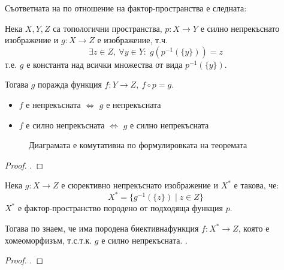 Съответната на  по отношение на фактор-пространства е следната:
\begin{theorem}\label{th:factor-continuous}
    Нека $X, Y, Z$ са топологични пространства, $p: X \to Y$ е силно непрекъснато изображение и $g: X \to Z$ е изображение, т.ч.
    \begin{equation}
        \exists z \in Z,\ \forall y \in Y:\; g(p^{-1}(\{y\})) = z
    \end{equation}
    т.е. $g$ е константа над всички множества от вида $p^{-1}(\{y\})$.

    Тогава $g$ поражда функция $f: Y \to Z,\ f \circ p = g$.
    \begin{itemize}
        \item $f$ е непрекъсната $\iff$ $g$ е непрекъсната
        \item $f$ е силно непрекъсната $\iff$ $g$ е силно непрекъсната
    \end{itemize}

    \begin{figure}[H]
        \centering
        \caption{Диаграмата е комутативна по формулировката на теоремата}
    \end{figure}
\end{theorem}
\begin{proof}
    \cite[стр.~142]{munkrestopology}.
\end{proof}
\begin{corollary}
    Нека $g: X \to Z$ е сюрективно непрекъснато изображение и $X^*$ е такова, че:
    \begin{equation}
        X^* = \{g^{-1}(\{z\}) \mid z \in Z\}
    \end{equation}
    $X^*$ е фактор-пространство породено от подходяща функция $p$.

    Тогава по  знаем, че има породена биективна\footnotemark  функция $f: X^* \to Z$, която е хомеоморфизъм, т.с.т.к. $g$ е силно непрекъсната.  
    .
\end{corollary}
\begin{proof}
    \cite[стр.~142-143]{munkrestopology}.
\end{proof}

